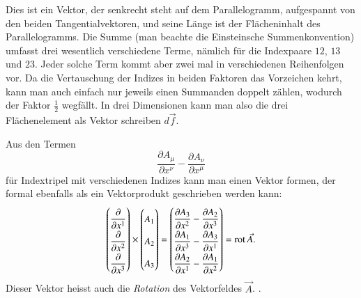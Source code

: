 Dies ist ein Vektor, der senkrecht steht auf dem Parallelogramm,
aufgespannt von den beiden Tangentialvektoren, und seine Länge ist
der Flächeninhalt des Parallelogramms.
Die Summe (man beachte die Einsteinsche Summenkonvention) umfasst
drei wesentlich verschiedene Terme, nämlich für die Indexpaare
$12$, $13$ und $23$.
Jeder solche Term kommt aber zwei mal in verschiedenen Reihenfolgen
vor.
Da die Vertauschung der Indizes in beiden Faktoren das Vorzeichen 
kehrt, kann man auch einfach nur jeweils einen Summanden doppelt
zählen, wodurch der Faktor $\frac12$ wegfällt.
In drei Dimensionen kann man also die drei Flächenelement als Vektor
schreiben $d\vec f$.

Aus den Termen
\[
\frac{\partial A_\mu}{\partial x^\nu}
-
\frac{\partial A_\nu}{\partial x^\mu}
\]
für Indextripel mit verschiedenen Indizes kann man einen Vektor
formen, der formal ebenfalls als ein Vektorprodukt geschrieben
werden kann:
\[
{
\def\arraystretch{1.9}
\begin{pmatrix}
\displaystyle \frac{\partial}{\partial x^1}\\
\displaystyle \frac{\partial}{\partial x^2}\\
\displaystyle \frac{\partial}{\partial x^3}
\end{pmatrix}
}
\times
\begin{pmatrix}
A_1\\A_2\\A_3
\end{pmatrix}
=
{
\def\arraystretch{1.9}
\begin{pmatrix}
\displaystyle
\frac{\partial A_3}{\partial x^2}-\frac{\partial A_2}{\partial x^3}\\
\displaystyle
\frac{\partial A_1}{\partial x^3}-\frac{\partial A_3}{\partial x^1}\\
\displaystyle
\frac{\partial A_2}{\partial x^1}-\frac{\partial A_1}{\partial x^2}
\end{pmatrix}
}
=
\operatorname{rot}\vec A.
\]
Dieser Vektor heisst auch die {\em Rotation} des Vektorfeldes $\vec A$.
.%

